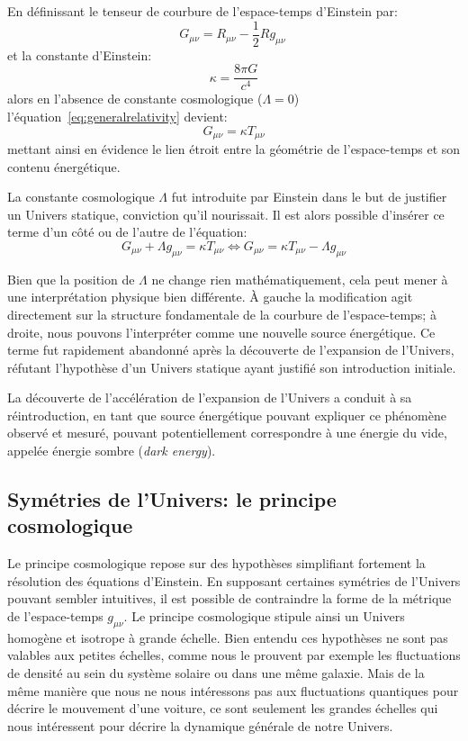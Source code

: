 \documentclass[../main/main.tex]{subfiles}
\begin{document}
En définissant le tenseur de courbure de l'espace-temps d'Einstein par:
\begin{equation}
  \label{eq:tenseurspacetime}
  G_{\mu\nu} = R_{\mu\nu} - \frac{1}{2}Rg_{\mu\nu} \ 
\end{equation}
et la constante d'Einstein:
\begin{equation}
  \label{eq:einsteinconstante}
  \kappa = \frac{8\pi G}{c^{4}}
\end{equation}
alors en l'absence de constante cosmologique ($\Lambda=0$)
l'équation~\ref{eq:generalrelativity} devient:
\begin{equation}
  \label{eq:einsteinreduce}
  G_{\mu\nu} = \kappa T_{\mu\nu}
\end{equation}
mettant ainsi en évidence le lien étroit entre la géométrie de
l'espace-temps et son contenu énergétique.

La constante cosmologique $\Lambda$ fut introduite par Einstein dans le
but de justifier un Univers statique, conviction qu'il nourissait. Il est
alors possible d'insérer ce terme d'un côté ou de l'autre de l'équation:
\begin{equation}
  \label{eq:einsteinlambda}
  G_{\mu\nu} + \Lambda g_{\mu\nu} = \kappa T_{\mu\nu} \Longleftrightarrow G_{\mu\nu}  = \kappa T_{\mu\nu} - \Lambda g_{\mu\nu}
\end{equation}

Bien que la position de $\Lambda$ ne change rien mathématiquement, cela peut mener à une
interprétation physique bien différente. À gauche la modification agit
directement sur la structure fondamentale de la courbure de l'espace-temps;
à droite, nous pouvons l'interpréter comme une nouvelle source
énergétique. Ce terme fut rapidement abandonné après la découverte de
l'expansion de l'Univers, réfutant l'hypothèse d'un Univers statique
ayant justifié son introduction initiale.

La découverte de l'accélération de l'expansion de l'Univers
\citep{Riess1998, Perlmutter1999} a conduit à sa réintroduction, en tant
que source énergétique pouvant expliquer ce phénomène observé et mesuré,
pouvant potentiellement correspondre à une énergie du vide, appelée
énergie sombre (\textit{dark energy}).

\subsection{Symétries de l'Univers: le principe cosmologique}

Le principe cosmologique repose sur des hypothèses simplifiant fortement
la résolution des équations d'Einstein. En supposant certaines symétries
de l'Univers pouvant sembler intuitives, il est possible de contraindre la forme de
la métrique de l'espace-temps $g_{\mu\nu}$. Le principe cosmologique
stipule ainsi un Univers homogène et isotrope à grande échelle.
Bien entendu ces hypothèses ne sont pas valables aux petites échelles,
comme nous le prouvent par exemple les fluctuations de densité au sein
du système solaire ou dans une même galaxie. Mais de la même manière que
nous ne nous intéressons pas aux fluctuations quantiques pour décrire le
mouvement d'une voiture, ce sont seulement les grandes échelles qui nous
intéressent pour décrire la dynamique générale de notre Univers.
\end{document}
